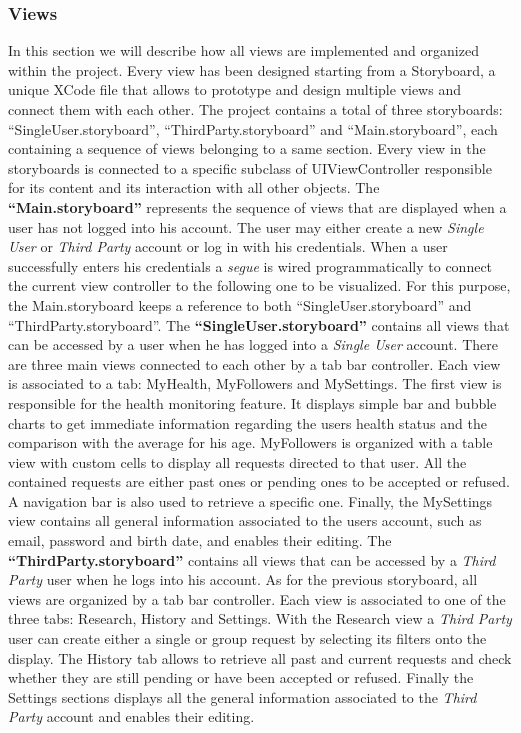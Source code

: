 \documentclass[titlepage]{article}
\begin{document}
	\subsubsection{Views}
	In this section we will describe how all views are implemented and organized within the project. Every view has been designed starting from a Storyboard, a unique XCode file that allows to prototype and design multiple views and connect them with each other. The project contains a total of three storyboards: “SingleUser.storyboard”, “ThirdParty.storyboard” and “Main.storyboard”, each containing a sequence of views belonging to a same section. Every view in the storyboards is connected to a specific subclass of UIViewController responsible for its content and its interaction with all other objects. \newline
	\newline
	The {\bf “Main.storyboard”} represents the sequence of views that are displayed when a user has not logged into his account. The user may either create a new {\it Single User} or {\it Third Party} account or log in with his credentials. When a user successfully enters his credentials a {\it segue} is wired programmatically to connect the current view controller to the following one to be visualized. For this purpose, the Main.storyboard keeps a reference to both “SingleUser.storyboard” and “ThirdParty.storyboard”. \newline
	\newline
	The  {\bf “SingleUser.storyboard”} contains all views that can be accessed by a user when he has logged into a {\it Single User} account. There are three main views connected to each other by a tab bar controller. Each view is associated to a tab: MyHealth, MyFollowers and MySettings. The first view is responsible for the health monitoring feature. It displays simple bar and bubble charts to get immediate information regarding the user\textsc{}s health status and the comparison with the average for his age. MyFollowers is organized with a table view with custom cells to display all requests directed to that user. All the contained requests are either past ones or pending ones to be accepted or refused. A navigation bar is also used to retrieve a specific one. Finally, the MySettings view contains all general information associated to the user\textsc{}s account, such as email, password and birth date, and enables their editing.\newline
	\newline
	The {\bf “ThirdParty.storyboard”} contains all views that can be accessed by a {\it Third Party} user when he logs into his account. As for the previous storyboard, all views are organized by a tab bar controller. Each view is associated to one of the three tabs: Research, History and Settings. With the Research view a {\it Third Party} user can create either a single or group request by selecting its filters onto the display. The History tab allows to retrieve all past and current requests and check whether they are still pending or have been accepted or refused. Finally the Settings sections displays all the general information associated to the {\it Third Party} account and enables their editing.\newline
\end{document}
